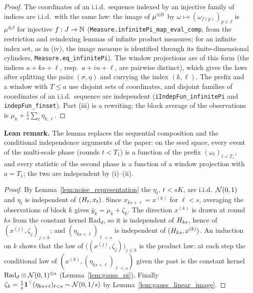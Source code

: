 \begin{proof}
\leanok
{}
The coordinates of an i.i.d.\ sequence indexed by an injective family of indices are
i.i.d.\ with the same law: the image of $\mu^{\otimes\mathbb{N}}$ by
$\omega \mapsto (\omega_{f(p)})_{p \in J}$ is $\mu^{\otimes J}$ for injective $f : J \to \mathbb{N}$
(\texttt{Measure.infinitePi\_map\_eval\_comp}, from the restriction and reindexing lemmas of
infinite product measures; for an infinite index set, as in (iv), the image measure is
identified through its finite-dimensional cylinders, \texttt{Measure.eq\_infinitePi}). The window projections are of this form (the indices
$a + ks + \ell$, resp.\ $a + in + \ell$, are pairwise distinct), which gives the laws after
splitting the pairs $(\sigma, \eta)$ and currying the index $(k, \ell)$. The prefix and a
window with $T \le a$ use disjoint sets of coordinates, and disjoint families of
coordinates of an i.i.d.\ sequence are independent (\texttt{iIndepFun\_infinitePi} and
\texttt{indepFun\_finset}). Part (iii) is a rewriting: the block average of the
observations is $\mu_k + \frac1s\sum_\ell \eta_{k,\ell}$.
\end{proof}

\textbf{Lean remark.} The lemma replaces the sequential composition and the conditional
independence arguments of the paper: on the seed space, every event of the multi-scale
phase (rounds $t < T_1$) is a function of the prefix $(\omega_t)_{t<T_1}$, and every
statistic of the second phase is a function of a window projection with $a = T_1$; the two
are independent by (i)--(ii).

\begin{proof}
By Lemma~\ref{lem:noise_representation} the $\eta_t$, $t < sK$, are i.i.d.\ $\mathcal{N}(0,1)$
and $\eta_t$ is independent of $(H_t, x_t)$. Since $x_{ks+\ell} = x^{(k)}$ for
$\ell < s$, averaging the observations of block $k$ gives $\bar y_k = \mu_k + \zeta_k$.
The direction $x^{(k)}$ is drawn at round $ks$ from the constant kernel $\mathrm{Rad}_d$, so
it is independent of $H_{ks}$, hence of $(x^{(j)}, \zeta_j)_{j<k}$; and
$(\eta_{ks+\ell})_{\ell<s}$ is independent of $(H_{ks}, x^{(k)})$. An induction on $k$
shows that the law of $\big((x^{(j)},\zeta_j)\big)_{j \le k}$ is the product law: at each
step the conditional law of $(x^{(k)}, (\eta_{ks+\ell})_{\ell<s})$ given the past is the
constant kernel $\mathrm{Rad}_d \otimes \mathcal{N}(0,1)^{\otimes s}$ (Lemma~\ref{lem:gauss_pi}).
Finally $\zeta_k = \frac1s\mathbf 1^\top(\eta_{ks+\ell})_{\ell<s} \sim \mathcal{N}(0, 1/s)$ by
Lemma~\ref{lem:gauss_linear_image}.
\end{proof}

